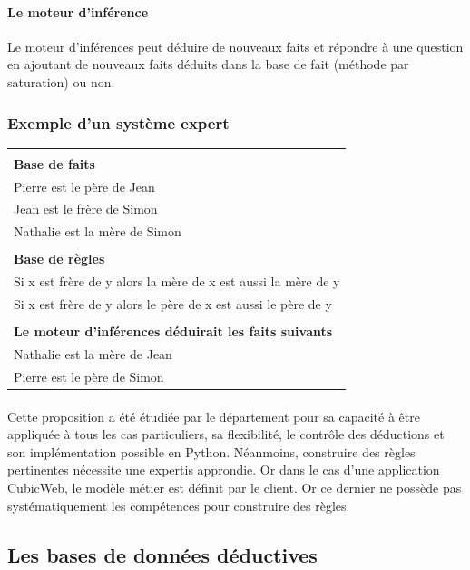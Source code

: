 \documentclass {report}
\begin{document}
\paragraph{Le moteur d'inférence}
Le moteur d'inférences peut déduire de nouveaux faits et répondre à une question en ajoutant de nouveaux faits déduits dans la base de fait (méthode par saturation) ou non.

\subsubsection{Exemple d'un système expert}

\begin{tabular}{|l|}
\hline
\\
\textbf{Base de faits}\\
Pierre est le père de Jean\\
Jean est le frère de Simon\\
Nathalie est la mère de Simon\\
\\
\textbf{Base de règles}\\
Si x est frère de y alors la mère de x est aussi la mère de y\\
Si x est frère de y alors le père de x est aussi le père de y\\
\\
\textbf{Le moteur d'inférences déduirait les faits suivants}\\
Nathalie est la mère de Jean\\
Pierre est le père de Simon\\
\hline
\end{tabular}

\paragraph{}
Cette proposition a été étudiée par le département pour sa capacité à être appliquée à tous les cas particuliers, sa flexibilité, le contrôle des déductions et son implémentation possible en Python. Néanmoins, construire des règles pertinentes nécessite une expertis approndie. Or dans le cas d'une application CubicWeb, le modèle métier est définit par le client. Or ce dernier ne possède pas systématiquement les compétences pour construire des règles.


\subsection{Les bases de données déductives}
\end{document}
